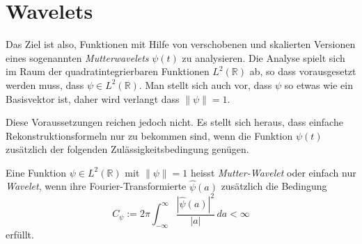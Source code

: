 %
%
%
\section{Wavelets}
Das Ziel ist also, Funktionen mit Hilfe von verschobenen und skalierten
Versionen eines sogenannten {\em Mutterwavelets} $\psi(t)$ zu analysieren.
Die Analyse spielt sich im Raum der quadratintegrierbaren Funktionen
$L^2(\mathbb R)$ ab, so dass vorausgesetzt werden muss,
dass $\psi\in L^2(\mathbb R)$.
Man stellt sich auch vor, dass $\psi$ so etwas wie ein Basisvektor ist,
daher wird verlangt dass $\|\psi\|=1$.

Diese Voraussetzungen reichen jedoch nicht.
Es stellt sich heraus, dass einfache Rekonstruktionsformeln nur zu
bekommen sind, wenn die Funktion $\psi(t)$ zusätzlich der folgenden
Zulässigkeitsbedingung genügen.

\begin{definition}
Eine Funktion $\psi\in L^2(\mathbb R)$ mit $\|\psi\|=1$ heisst 
{\em Mutter-Wavelet} oder einfach nur {\em Wavelet}, wenn ihre
Fourier-Transformierte $\hat{\psi}(a)$ zusätzlich die Bedingung
\begin{equation}
C_{\psi}
:=
2\pi
\int_{-\infty}^\infty \frac{|\hat{\psi}(a)|^2}{|a|}\,da < \infty
\label{cwt:zulaessig}
\end{equation}
erfüllt.
\end{definition}

